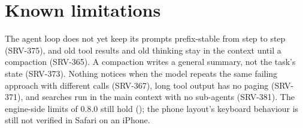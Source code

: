 \section{Known limitations}\label{sec:chat-limits}

The agent loop does not yet keep its prompts prefix-stable from step to step (SRV-375), and old tool results and old thinking stay in the context until a compaction (SRV-365). A compaction writes a general summary, not the task's state (SRV-373). Nothing notices when the model repeats the same failing approach with different calls (SRV-367), long tool output has no paging (SRV-371), and searches run in the main context with no sub-agents (SRV-381). The engine-side limits of 0.8.0 still hold (); the phone layout's keyboard behaviour is still not verified in Safari on an iPhone.
